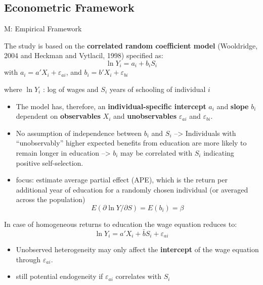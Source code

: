 \documentclass[10pt,ignorenonframetext,]{beamer}
\begin{document}
\hypertarget{econometric-framework}{%
\subsection{Econometric Framework}\label{econometric-framework}}

\begin{frame}[allowframebreaks]{M: Empirical Framework}
\protect\hypertarget{m-empirical-framework}{}

The study is based on the \textbf{correlated random coefficient model}
(Wooldridge, 2004 and Heckman and Vytlacil, 1998) specified as:
\[\ln Y_i = a_i + b_i S_i\] with \(a_i = a'X_i + \varepsilon_{ai}\), and
\(b_i = b'X_i + \varepsilon_{bi}\)

where \(\ln Y_i\) : log of wages and \(S_i\) years of schooling of
individual \(i\)

\begin{itemize}
\item
  The model has, therefore, an \textbf{individual-specific intercept}
  \(a_i\) and \textbf{slope} \(b_i\) dependent on \textbf{observables}
  \(X_i\) and \textbf{unobservables} \(\varepsilon_{ai}\) and
  \(\varepsilon_{bi}\).
\item
  No assumption of independence between \(b_i\) and \(S_i\)
  --\textgreater{} Individuals with ``unobservably'' higher expected
  benefits from education are more likely to remain longer in education
  --\textgreater{} \(b_i\) may be correlated with \(S_i\) indicating
  positive self-selection.
\item
  focus: estimate average partial effect (APE), which is the return per
  additional year of education for a randomly chosen individual (or
  averaged across the population)
  \[E(\partial \ln Y / \partial S) = E(b_i) = \beta\]
\end{itemize}

In case of homogeneous returns to education the wage equation reduces
to: \[\ln Y_i = a'X_i + \bar b S_i + \varepsilon_{ai}\]

\begin{itemize}
\item
  Unobserved heterogeneity may only affect the \textbf{intercept} of the
  wage equation through \(\varepsilon_{ai}\).
\item
  still potential endogeneity if \(\varepsilon_{ai}\) correlates with
  \(S_i\)
\end{itemize}

\end{frame}
\end{document}
